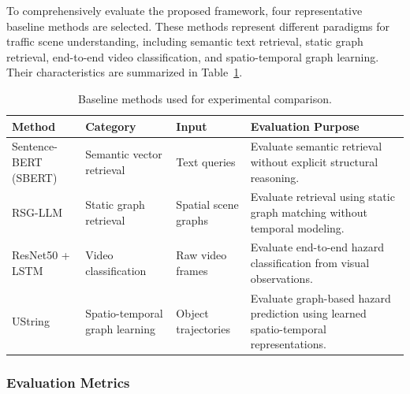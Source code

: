 \documentclass[a4paper, 11pt]{article} %
\begin{document}
To comprehensively evaluate the proposed framework, four representative baseline methods are selected. These methods represent different paradigms for traffic scene understanding, including semantic text retrieval, static graph retrieval, end-to-end video classification, and spatio-temporal graph learning. Their characteristics are summarized in Table~\ref{tab:baselines}.
\begin{table}[H]
\centering
\begin{tabular}{|p{3.2cm}|p{3.8cm}|p{3.0cm}|p{5.2cm}|}
\hline
\textbf{Method} &
\textbf{Category} &
\textbf{Input} &
\textbf{Evaluation Purpose}
\\
\hline

Sentence-BERT (SBERT) \cite{reimers2019sentence}
&
Semantic vector retrieval
&
Text queries
&
Evaluate semantic retrieval without explicit structural reasoning.
\\
\hline

RSG-LLM \cite{tian2025query}
&
Static graph retrieval
&
Spatial scene graphs
&
Evaluate retrieval using static graph matching without temporal modeling.
\\
\hline

ResNet50 + LSTM \cite{malawade2022roadscene2vec}
&
Video classification
&
Raw video frames
&
Evaluate end-to-end hazard classification from visual observations.
\\
\hline

UString \cite{bao2020uncertainty}
&
Spatio-temporal graph learning
&
Object trajectories
&
Evaluate graph-based hazard prediction using learned spatio-temporal representations.
\\
\hline

\end{tabular}
\caption{Baseline methods used for experimental comparison.}
\label{tab:baselines}
\end{table}
\subsubsection{Evaluation Metrics}
\end{document}
